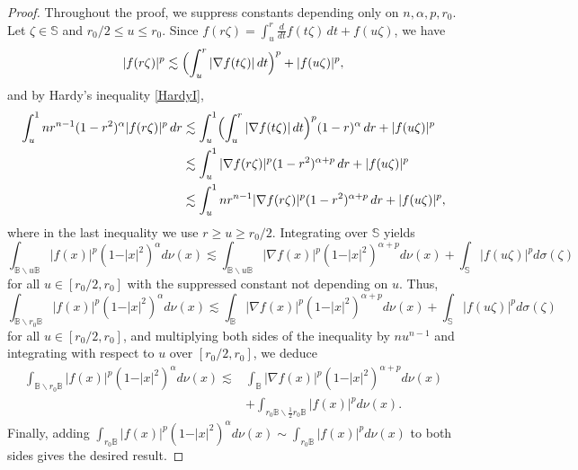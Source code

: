 \documentclass{amsart}
\theoremstyle{definition}
\theoremstyle{remark}
\begin{document}
\begin{proof}
Throughout the proof, we suppress constants depending only on $n,\alpha,p,r_0$.
Let $\zeta\in\mathbb S$ and $r_0/2\le u\le r_0$.
Since $f(r\zeta)=\int_u^r \frac{d}{dt}f(t\zeta)\,dt+f(u\zeta)$, we have
\begin{equation*}
\vert f(r\zeta)\vert^p
\lesssim \Bigl(\int_u^r\vert\nabla f(t\zeta)\vert\,dt\Bigr)^p+\vert f(u\zeta)\vert^p,
\end{equation*}
and by Hardy's inequality \eqref{HardyI},
\begin{align*}
\int_u^1 nr^{n-1}(1-r^2)^\alpha\vert f(r\zeta)\vert^p\,dr
&\lesssim \int_u^1\Bigl(\int_u^r\vert\nabla f(t\zeta)\vert\,dt\Bigr)^p
(1-r)^\alpha\,dr+\vert f(u\zeta)\vert^p\\
&\lesssim \int_u^1 \vert\nabla f(r\zeta)\vert^p (1-r^2)^{\alpha+p}\,dr
+\vert f(u\zeta)\vert^p\\
&\lesssim \int_u^1 nr^{n-1}\vert\nabla f(r\zeta)\vert^p (1-r^2)^{\alpha+p}\,dr
+\vert f(u\zeta)\vert^p,
\end{align*}
where in the last inequality we use $r\ge u\ge r_0/2$.
Integrating over $\mathbb S$ yields
\begin{equation*}
\int_{\mathbb B\backslash u\mathbb B}
\vert f(x)\vert^p(1-\vert x\vert^2)^\alpha d\nu(x)
\lesssim \int_{\mathbb B\backslash u\mathbb B}
\vert\nabla f(x)\vert^p(1-\vert x\vert^2)^{\alpha+p} d\nu(x)
+\int_{\mathbb S}\vert f(u\zeta)\vert^p d\sigma(\zeta)
\end{equation*}
for all $u\in [r_0/2,r_0]$ with the suppressed constant not depending on $u$.
Thus,
\begin{equation*}
\int_{\mathbb B\backslash r_0\mathbb B}
\vert f(x)\vert^p(1-\vert x\vert^2)^\alpha d\nu(x)
\lesssim \int_{\mathbb B}
\vert\nabla f(x)\vert^p(1-\vert x\vert^2)^{\alpha+p} d\nu(x)
+\int_{\mathbb S}\vert f(u\zeta)\vert^p d\sigma(\zeta)
\end{equation*}
for all $u\in [r_0/2,r_0]$, and multiplying both sides of the inequality
by $nu^{n-1}$ and integrating with respect to $u$ over $[r_0/2,r_0]$,
we deduce
\begin{align*}
\int_{\mathbb B\backslash r_0\mathbb B}
\vert f(x)\vert^p(1-\vert x\vert^2)^\alpha d\nu(x)
\lesssim &\int_{\mathbb B}
\vert\nabla f(x)\vert^p(1-\vert x\vert^2)^{\alpha+p} d\nu(x)\\
&+\int_{r_0\mathbb B\backslash \frac{1}{2}r_0\mathbb B}
\vert f(x)\vert^p d\nu(x).
\end{align*}
Finally, adding
$\int_{r_0\mathbb B}\vert f(x)\vert^p(1-\vert x\vert^2)^\alpha d\nu(x)
\sim \int_{r_0\mathbb B}\vert f(x)\vert^p d\nu(x)$
to both sides gives the desired result.
\end{proof}
\end{document}
